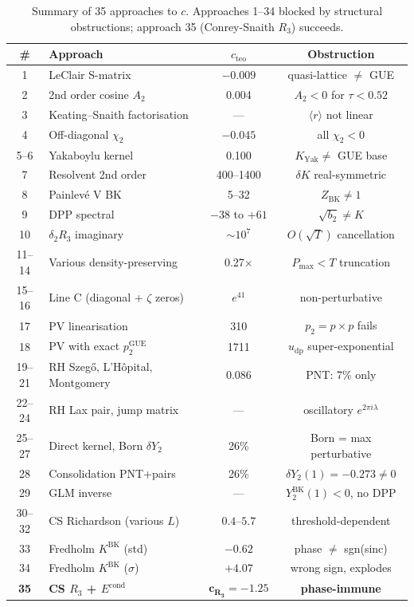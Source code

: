 \documentclass[10pt]{article}
\begin{document}
\begin{table}[h]
\centering
\caption{Summary of 35 approaches to $c$. Approaches 1--34 blocked by
structural obstructions; approach 35 (Conrey-Snaith $R_3$) succeeds.}
\label{tab:29approaches}
\begin{tabular}{clcc}
\toprule
\# & Approach & $c_{\mathrm{teo}}$ & Obstruction \\
\midrule
1 & LeClair S-matrix & $-0.009$ & quasi-lattice $\neq$ GUE \\
2 & 2nd order cosine $A_2$ & 0.004 & $A_2 < 0$ for $\tau < 0.52$ \\
3 & Keating--Snaith factorisation & --- & $\langle r\rangle$ not linear \\
4 & Off-diagonal $\chi_2$ & $-0.045$ & all $\chi_2 < 0$ \\
5--6 & Yakaboylu kernel & 0.100 & $K_{\mathrm{Yak}} \neq$ GUE base \\
7 & Resolvent 2nd order & 400--1400 & $\delta K$ real-symmetric \\
8 & Painlev\'e V BK & 5--32 & $Z_{\mathrm{BK}} \neq 1$ \\
9 & DPP spectral & $-38$ to $+61$ & $\sqrt{b_2} \neq K$ \\
10 & $\delta_2 R_3$ imaginary & $\sim 10^7$ & $O(\sqrt{T})$ cancellation \\
11--14 & Various density-preserving & 0.27$\times$ & $P_{\max} < T$ truncation \\
15--16 & Line C (diagonal + $\zeta$ zeros) & $e^{41}$ & non-perturbative \\
17 & PV linearisation & 310 & $p_2 = p \times p$ fails \\
18 & PV with exact $p_2^{\mathrm{GUE}}$ & 1711 & $u_{\mathrm{dp}}$ super-exponential \\
19--21 & RH Szeg\H{o}, L'H\^opital, Montgomery & 0.086 & PNT: 7\% only \\
22--24 & RH Lax pair, jump matrix & --- & oscillatory $e^{2\pi i\lambda}$ \\
25--27 & Direct kernel, Born $\delta Y_2$ & 26\% & Born = max perturbative \\
28 & Consolidation PNT+pairs & 26\% & $\delta Y_2(1) = -0.273 \neq 0$ \\
29 & GLM inverse & --- & $Y_2^{\mathrm{BK}}(1) < 0$, no DPP \\
30--32 & CS Richardson (various $L$) & $0.4$--$5.7$ & threshold-dependent \\
33 & Fredholm $K^{\mathrm{BK}}$ (std) & $-0.62$ & phase $\neq$ sgn(sinc) \\
34 & Fredholm $K^{\mathrm{BK}}$ ($\sigma$) & $+4.07$ & wrong sign, explodes \\
\textbf{35} & \textbf{CS $R_3$ + $E^{\mathrm{cond}}$} & $\mathbf{c_{R_3} = -1.25}$ & \textbf{phase-immune} \\
\bottomrule
\end{tabular}
\end{table}
\end{document}
